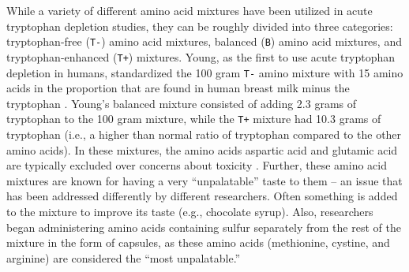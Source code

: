 While a variety of different amino acid mixtures have been utilized in acute tryptophan depletion studies, they can be roughly divided into three categories: tryptophan-free (\texttt{T-}) amino acid mixtures, balanced (\texttt{B}) amino acid mixtures, and tryptophan-enhanced (\texttt{T+}) mixtures. Young, as the first to use acute tryptophan depletion in humans, standardized the 100 gram \texttt{T-} amino mixture with 15 amino acids in the proportion that are found in human breast milk minus the tryptophan \parencite{Young1985}. Young's balanced mixture consisted of adding 2.3 grams of tryptophan to the 100 gram mixture, while the \texttt{T+} mixture had 10.3 grams of tryptophan (i.e., a higher than normal ratio of tryptophan compared to the other amino acids). In these mixtures, the amino acids aspartic acid and glutamic acid are typically excluded over concerns about toxicity \parencite{Hood05}. Further, these amino acid mixtures are known for having a very ``unpalatable'' taste to them -- an issue that has been addressed differently by different researchers. Often something is added to the mixture to improve its taste (e.g., chocolate syrup). Also, researchers began administering amino acids containing sulfur separately from the rest of the mixture in the form of capsules, as these amino acids (methionine, cystine, and arginine) are considered the ``most unpalatable.''


